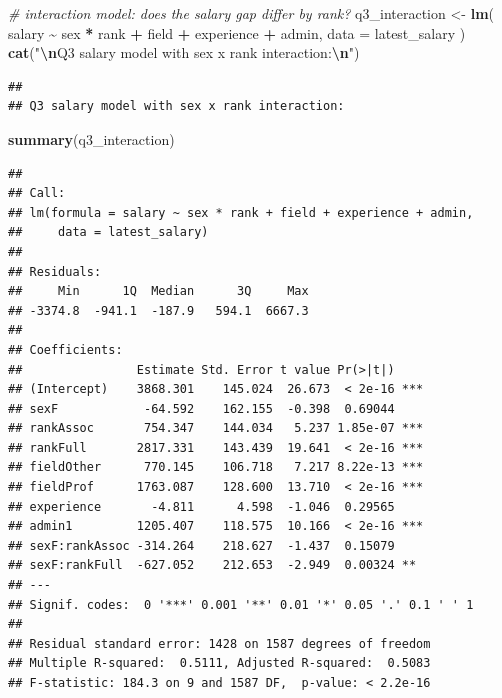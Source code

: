 \documentclass[
]{article}
\newenvironment{Shaded}{\begin{snugshade}}{\end{snugshade}}
\newcommand{\AttributeTok}[1]{\textcolor[rgb]{0.13,0.29,0.53}{#1}}
\newcommand{\CommentTok}[1]{\textcolor[rgb]{0.56,0.35,0.01}{\textit{#1}}}
\newcommand{\FunctionTok}[1]{\textcolor[rgb]{0.13,0.29,0.53}{\textbf{#1}}}
\newcommand{\NormalTok}[1]{#1}
\newcommand{\OtherTok}[1]{\textcolor[rgb]{0.56,0.35,0.01}{#1}}
\newcommand{\SpecialCharTok}[1]{\textcolor[rgb]{0.81,0.36,0.00}{\textbf{#1}}}
\newcommand{\StringTok}[1]{\textcolor[rgb]{0.31,0.60,0.02}{#1}}
\begin{document}
\begin{Shaded}
\begin{Highlighting}[]
\CommentTok{\# interaction model: does the salary gap differ by rank?}
\NormalTok{q3\_interaction }\OtherTok{\textless{}{-}} \FunctionTok{lm}\NormalTok{(}
\NormalTok{  salary }\SpecialCharTok{\textasciitilde{}}\NormalTok{ sex }\SpecialCharTok{*}\NormalTok{ rank }\SpecialCharTok{+}\NormalTok{ field }\SpecialCharTok{+}\NormalTok{ experience }\SpecialCharTok{+}\NormalTok{ admin,}
  \AttributeTok{data =}\NormalTok{ latest\_salary}
\NormalTok{)}
\FunctionTok{cat}\NormalTok{(}\StringTok{"}\SpecialCharTok{\textbackslash{}n}\StringTok{Q3 salary model with sex x rank interaction:}\SpecialCharTok{\textbackslash{}n}\StringTok{"}\NormalTok{)}
\end{Highlighting}
\end{Shaded}

\begin{verbatim}
## 
## Q3 salary model with sex x rank interaction:
\end{verbatim}

\begin{Shaded}
\begin{Highlighting}[]
\FunctionTok{summary}\NormalTok{(q3\_interaction)}
\end{Highlighting}
\end{Shaded}

\begin{verbatim}
## 
## Call:
## lm(formula = salary ~ sex * rank + field + experience + admin, 
##     data = latest_salary)
## 
## Residuals:
##     Min      1Q  Median      3Q     Max 
## -3374.8  -941.1  -187.9   594.1  6667.3 
## 
## Coefficients:
##                Estimate Std. Error t value Pr(>|t|)    
## (Intercept)    3868.301    145.024  26.673  < 2e-16 ***
## sexF            -64.592    162.155  -0.398  0.69044    
## rankAssoc       754.347    144.034   5.237 1.85e-07 ***
## rankFull       2817.331    143.439  19.641  < 2e-16 ***
## fieldOther      770.145    106.718   7.217 8.22e-13 ***
## fieldProf      1763.087    128.600  13.710  < 2e-16 ***
## experience       -4.811      4.598  -1.046  0.29565    
## admin1         1205.407    118.575  10.166  < 2e-16 ***
## sexF:rankAssoc -314.264    218.627  -1.437  0.15079    
## sexF:rankFull  -627.052    212.653  -2.949  0.00324 ** 
## ---
## Signif. codes:  0 '***' 0.001 '**' 0.01 '*' 0.05 '.' 0.1 ' ' 1
## 
## Residual standard error: 1428 on 1587 degrees of freedom
## Multiple R-squared:  0.5111, Adjusted R-squared:  0.5083 
## F-statistic: 184.3 on 9 and 1587 DF,  p-value: < 2.2e-16
\end{verbatim}
\end{document}
